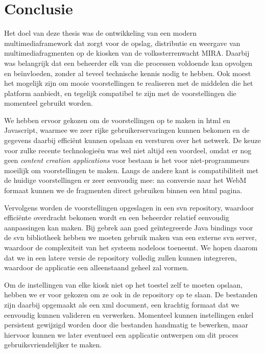 %
%

\chapter{Conclusie}

Het doel van deze thesis was de ontwikkeling van een modern multimediaframework dat zorgt voor de opslag, distributie en weergave van multimediafragmenten op de kiosken van de volkssterrenwacht MIRA. Daarbij was belangrijk dat een beheerder elk van die processen voldoende kan opvolgen en beïnvloeden, zonder al teveel technische kennis nodig te hebben. Ook moest het mogelijk zijn om mooie voorstellingen te realiseren met de middelen die het platform aanbiedt, en tegelijk compatibel te zijn met de voorstellingen die momenteel gebruikt worden.

We hebben ervoor gekozen om de voorstellingen op te maken in \ac{html} en Javascript, waarmee we zeer rijke gebruikerservaringen kunnen bekomen en de gegevens daarbij efficiënt kunnen opslaan en versturen over het netwerk. De keuze voor zulke recente technologieën was wel niet altijd een voordeel, omdat er nog geen \emph{content creation applications} voor bestaan is het voor niet-programmeurs moeilijk om voorstellingen te maken. Langs de andere kant is compatibiliteit met de huidige voorstellingen er zeer eenvoudig mee: na conversie naar het WebM formaat kunnen we de fragmenten direct gebruiken binnen een \ac{html} pagina.

Vervolgens worden de voorstellingen opgeslagen in een \ac{svn} repository, waardoor efficiënte overdracht bekomen wordt en een beheerder relatief eenvoudig aanpassingen kan maken. Bij gebrek aan goed geïntegreerde Java bindings voor de \ac{svn} bibliotheek hebben we moeten gebruik maken van een externe \ac{svn} server, waardoor de complexiteit van het systeem nodeloos toeneemt. We hopen daarom dat we in een latere versie de repository volledig zullen kunnen integreren, waardoor de applicatie een alleenstaand geheel zal vormen.

Om de instellingen van elke kiosk niet op het toestel zelf te moeten opslaan, hebben we er voor gekozen om ze ook in de repository op te slaan. De bestanden zijn daarbij opgemaakt als een \ac{xml} document, een krachtig formaat dat we eenvoudig kunnen valideren en verwerken. Momenteel kunnen instellingen enkel persistent gewijzigd worden door die bestanden handmatig te bewerken, maar hiervoor kunnen we later eventueel een applicatie ontwerpen om dit proces gebruiksvriendelijker te maken.

